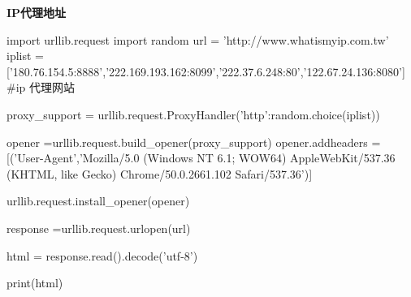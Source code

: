\documentclass[a4paper,10pt]{ctexart}
\begin{document}
\textbf{IP代理地址}
\begin{python}

import urllib.request
import random
url = 'http://www.whatismyip.com.tw'
iplist =['180.76.154.5:8888','222.169.193.162:8099','222.37.6.248:80','122.67.24.136:8080']
#ip 代理网站

proxy_support = urllib.request.ProxyHandler({'http':random.choice(iplist)})

opener =urllib.request.build_opener(proxy_support)
opener.addheaders =[('User-Agent','Mozilla/5.0 (Windows NT 6.1; WOW64) AppleWebKit/537.36 (KHTML, like Gecko) Chrome/50.0.2661.102 Safari/537.36')]


urllib.request.install_opener(opener)

response =urllib.request.urlopen(url)

html = response.read().decode('utf-8')

print(html)

\end{python}
\end{document}
